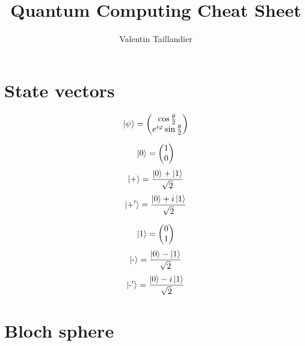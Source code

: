 \documentclass[a4paper,10pt]{scrartcl}
\title{Quantum Computing Cheat Sheet}
\author{Valentin Taillandier}
\begin{document}
\maketitle


\section*{State vectors}
\[\ket{\psi} = \begin{pmatrix}
\cos \frac{\theta}{2}\\ 
e^{i \varphi } \sin \frac{\theta}{2}
\end{pmatrix}\]


\begin{minipage}{\linewidth}
\begin{minipage}{0.5\linewidth}
\[\ket{0} = \begin{pmatrix}
1 \\
0
\end{pmatrix}\]
\[\ket{\text{+}} = \frac{\ket{0} + \ket{1}}{\sqrt{2}}\]
\[\ket{\text{+}'} = \frac{\ket{0} + i\ket{1}}{\sqrt{2}}\]

\end{minipage}
\begin{minipage}{0.5\linewidth}
\[\ket{1} = \begin{pmatrix}
0 \\
1
\end{pmatrix}\]
\[\ket{\text{-}} = \frac{\ket{0} - \ket{1}}{\sqrt{2}}\]
\[\ket{\text{-}'} = \frac{\ket{0} - i\ket{1}}{\sqrt{2}}\]
\end{minipage}
\end{minipage}


\section*{Bloch sphere}
\end{document}
